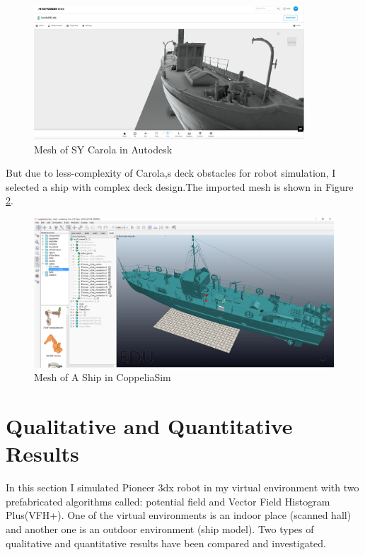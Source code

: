 \begin{figure}[H]
  \centering
  \includegraphics[width= 0.9\textwidth]{Figures/Carola mesh.PNG}
  \caption[Mesh of SY Carola in Autodesk]{Mesh of SY Carola in Autodesk}
   \label{fig:Mesh of SY Carola in Autodesk}
\end{figure}

\noindent But due to less-complexity of Carola,s deck obstacles for robot simulation, I selected a ship with complex deck design.The imported mesh is shown in Figure \ref{fig:Mesh of A Ship in CoppeliaSim}. 
\begin{figure}[H]
  \centering
  \includegraphics[width= 1.0\textwidth]{Figures/CoppeliaMesh.PNG}
  \caption[Mesh of A Ship in CoppeliaSim]{Mesh of A Ship in CoppeliaSim}
   \label{fig:Mesh of A Ship in CoppeliaSim}
\end{figure}



\section{Qualitative and Quantitative Results}
\noindent In this section I simulated Pioneer 3dx robot in my virtual environment with two prefabricated algorithms called: potential field and Vector Field Histogram Plus(VFH+). One of the virtual environments is an indoor place (scanned hall) and another one is an
outdoor environment (ship model). Two types of qualitative and quantitative results have been compared and investigated.
  
